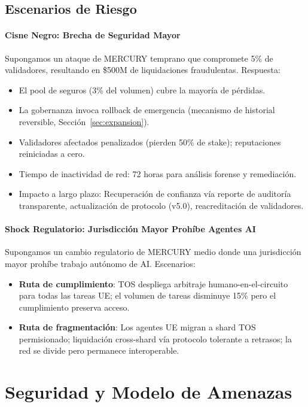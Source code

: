 \documentclass[11pt]{article}
\begin{document}
\subsection{Escenarios de Riesgo}
\paragraph{Cisne Negro: Brecha de Seguridad Mayor}
Supongamos un ataque de MERCURY temprano que compromete 5\% de validadores, resultando en \$500M de liquidaciones fraudulentas. Respuesta:
\begin{itemize}[noitemsep]
  \item El pool de seguros (3\% del volumen) cubre la mayoría de pérdidas.
  \item La gobernanza invoca rollback de emergencia (mecanismo de historial reversible, Sección~\ref{sec:expansion}).
  \item Validadores afectados penalizados (pierden 50\% de stake); reputaciones reiniciadas a cero.
  \item Tiempo de inactividad de red: 72 horas para análisis forense y remediación.
  \item Impacto a largo plazo: Recuperación de confianza vía reporte de auditoría transparente, actualización de protocolo (v5.0), reacreditación de validadores.
\end{itemize}

\paragraph{Shock Regulatorio: Jurisdicción Mayor Prohíbe Agentes AI}
Supongamos un cambio regulatorio de MERCURY medio donde una jurisdicción mayor prohíbe trabajo autónomo de AI. Escenarios:
\begin{itemize}[noitemsep]
  \item \textbf{Ruta de cumplimiento}: TOS despliega arbitraje humano-en-el-circuito para todas las tareas UE; el volumen de tareas disminuye 15\% pero el cumplimiento preserva acceso.
  \item \textbf{Ruta de fragmentación}: Los agentes UE migran a shard TOS permisionado; liquidación cross-shard vía protocolo tolerante a retrasos; la red se divide pero permanece interoperable.
\end{itemize}

\section{Seguridad y Modelo de Amenazas}
\label{sec:security}
\end{document}
